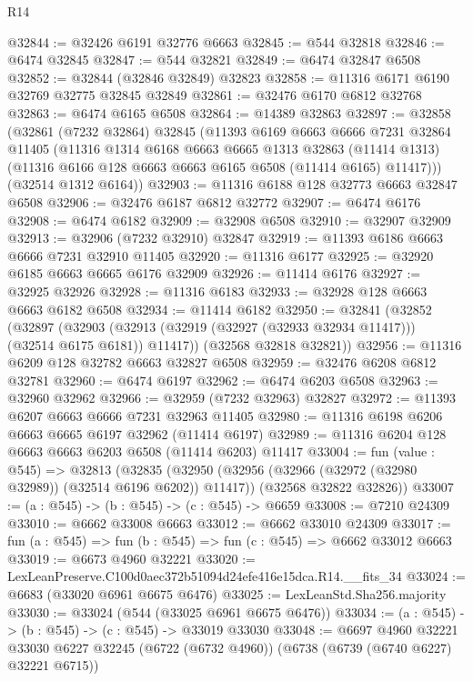 \begin{lexlean}{R14}
\begin{coremodule}
@32844 := @32426 @6191 @32776 @6663
@32845 := @544 @32818
@32846 := @6474 @32845
@32847 := @544 @32821
@32849 := @6474 @32847 @6508
@32852 := @32844 (@32846 @32849) @32823
@32858 := @11316 @6171 @6190 @32769 @32775 @32845 @32849
@32861 := @32476 @6170 @6812 @32768
@32863 := @6474 @6165 @6508
@32864 := @14389 @32863
@32897 := @32858
    (@32861
      (@7232 @32864)
      @32845
      (@11393
        @6169
        @6663
        @6666
        @7231
        @32864
        @11405
        (@11316
          @1314
          @6168
          @6663
          @6665
          @1313
          @32863
          (@11414 @1313)
          (@11316 @6166 @128 @6663 @6663 @6165 @6508 (@11414 @6165) @11417)))
      (@32514 @1312 @6164))
@32903 := @11316 @6188 @128 @32773 @6663 @32847 @6508
@32906 := @32476 @6187 @6812 @32772
@32907 := @6474 @6176
@32908 := @6474 @6182
@32909 := @32908 @6508
@32910 := @32907 @32909
@32913 := @32906 (@7232 @32910) @32847
@32919 := @11393 @6186 @6663 @6666 @7231 @32910 @11405
@32920 := @11316 @6177
@32925 := @32920 @6185 @6663 @6665 @6176 @32909
@32926 := @11414 @6176
@32927 := @32925 @32926
@32928 := @11316 @6183
@32933 := @32928 @128 @6663 @6663 @6182 @6508
@32934 := @11414 @6182
@32950 := @32841
    (@32852
      (@32897
        (@32903 (@32913 (@32919 (@32927 (@32933 @32934 @11417))) (@32514 @6175 @6181)) @11417))
      (@32568 @32818 @32821))
@32956 := @11316 @6209 @128 @32782 @6663 @32827 @6508
@32959 := @32476 @6208 @6812 @32781
@32960 := @6474 @6197
@32962 := @6474 @6203 @6508
@32963 := @32960 @32962
@32966 := @32959 (@7232 @32963) @32827
@32972 := @11393 @6207 @6663 @6666 @7231 @32963 @11405
@32980 := @11316 @6198 @6206 @6663 @6665 @6197 @32962 (@11414 @6197)
@32989 := @11316 @6204 @128 @6663 @6663 @6203 @6508 (@11414 @6203) @11417
@33004 := fun (value : @545) =>
  @32813
    (@32835
      (@32950 (@32956 (@32966 (@32972 (@32980 @32989)) (@32514 @6196 @6202)) @11417))
      (@32568 @32822 @32826))
@33007 := (a : @545) -> (b : @545) -> (c : @545) -> @6659
@33008 := @7210 @24309
@33010 := @6662 @33008 @6663
@33012 := @6662 @33010 @24309
@33017 := fun (a : @545) => fun (b : @545) => fun (c : @545) => @6662 @33012 @6663
@33019 := @6673 @4960 @32221
@33020 := LexLeanPreserve.C100d0aec372b51094d24efe416e15dca.R14.__fits_34
@33024 := @6683 (@33020 @6961 @6675 @6476)
@33025 := LexLeanStd.Sha256.majority
@33030 := @33024 (@544 (@33025 @6961 @6675 @6476))
@33034 := (a : @545) -> (b : @545) -> (c : @545) -> @33019 @33030
@33048 := @6697
    @4960
    @32221
    @33030
    @6227
    @32245
    (@6722 (@6732 @4960))
    (@6738 (@6739 (@6740 @6227) @32221 @6715))

\end{coremodule}
\end{lexlean}
